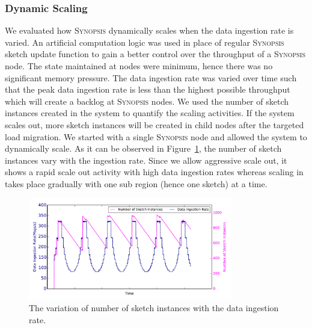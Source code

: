 \subsubsection{Dynamic Scaling}
We evaluated how \textsc{Synopsis} dynamically scales when the data ingestion rate is varied.
An artificial computation logic was used in place of regular \textsc{Synopsis} sketch update function to gain a better control over the throughput of a \textsc{Synopsis} node.
The state maintained at nodes were minimum, hence there was no significant memory pressure.
The data ingestion rate was varied over time such that the peak data ingestion rate is less than the highest possible throughput which will create a backlog at \textsc{Synopsis} nodes.
We used the number of sketch instances created in the system to quantify the scaling activities.
If the system scales out, more sketch instances will be created in child nodes after the targeted load migration.
We started with a single \textsc{Synopsis} node and allowed the system to dynamically scale.
As it can be observed in Figure~\ref{fig:dyn-scaling}, the number of sketch instances vary with the ingestion rate.
Since we allow aggressive scale out, it shows a rapid scale out activity with high data ingestion rates whereas scaling in takes place gradually with one sub region (hence one sketch) at a time.
\begin{figure}
    \centerline{\includegraphics[width=3.5in]{figures/dyn-scaling.pdf}}
    \caption{The variation of number of sketch instances with the data ingestion rate.}
    \label{fig:dyn-scaling}
\end{figure}


